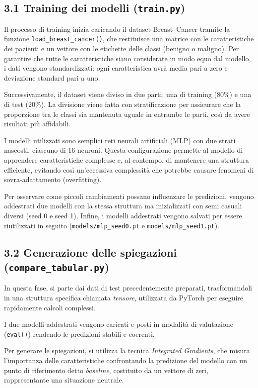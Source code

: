 \documentclass[a4paper,11pt]{article}
\begin{document}
\subsection*{3.1 Training dei modelli (\texttt{train.py})}
Il processo di training inizia caricando il dataset Breast–Cancer tramite la funzione \texttt{load\_breast\_cancer()}, che restituisce una matrice con le caratteristiche dei pazienti e un vettore con le etichette delle classi (benigno o maligno). Per garantire che tutte le caratteristiche siano considerate in modo equo dal modello, i dati vengono standardizzati: ogni caratteristica avrà media pari a zero e deviazione standard pari a uno.

Successivamente, il dataset viene diviso in due parti: una di training (80\%) e una di test (20\%). La divisione viene fatta con stratificazione per assicurare che la proporzione tra le classi sia mantenuta uguale in entrambe le parti, così da avere risultati più affidabili.

I modelli utilizzati sono semplici reti neurali artificiali (MLP) con due strati nascosti, ciascuno di 16 neuroni. Questa configurazione permette al modello di apprendere caratteristiche complesse e, al contempo, di mantenere una struttura efficiente, evitando così un'eccessiva complessità che potrebbe causare fenomeni di sovra-adattamento (overfitting).

Per osservare come piccoli cambiamenti possano influenzare le predizioni, vengono addestrati due modelli con la stessa struttura ma inizializzati con semi casuali diversi (seed 0 e seed 1). Infine, i modelli addestrati vengono salvati per essere riutilizzati in seguito (\texttt{models/mlp\_seed0.pt} e \texttt{models/mlp\_seed1.pt}).

\subsection*{3.2 Generazione delle spiegazioni (\texttt{compare\_tabular.py})}

In questa fase, si parte dai dati di test precedentemente preparati, trasformandoli in una struttura specifica chiamata \emph{tensore}, utilizzata da PyTorch per eseguire rapidamente calcoli complessi.

I due modelli addestrati vengono caricati e posti in modalità di valutazione (\texttt{eval()}) rendendo le predizioni stabili e coerenti.

Per generare le spiegazioni, si utilizza la tecnica \emph{Integrated Gradients}, che misura l'importanza delle caratteristiche confrontando la predizione del modello con un punto di riferimento detto \emph{baseline}, costituito da un vettore di zeri, rappresentante una situazione neutrale.
\end{document}
